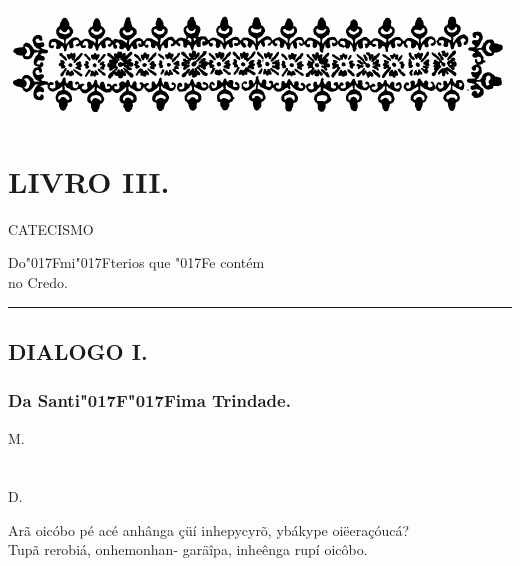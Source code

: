 \documentclass[openany,titlepage,12pt]{book}
\renewcommand{\chaptermark}[1]{\markboth{#1}{}}
\renewcommand{\sectionmark}[1]{\gdef\rightmark{#1}}
\newcommand{\lgS}{\char"017F}
\newcommand{\lgSS}{\char"017F\char"017F}
\begin{document}
\begin{center}
    \vspace*{20pt}
    \includegraphics[scale=0.33]{12.livro3.png}
\end{center}
\unskip
\vspace{-30pt}
{\let\clearpage\relax \chapter{\Huge LIVRO III.}}
\unskip
\vspace{-2pt}
\begin{center}
    {\large CATECISMO}
\end{center}
\unskip
\begin{center}
    Do\lgS mi\lgS terios que \lgS e contém\\
    no Credo.
\end{center}
\unskip
\par\noindent\rule{\textwidth}{0.4pt}
\unskip\vspace{-3pt}
\section{DIALOGO I.}
\unskip\vspace{-3pt}
\subsection{Da Santi\lgSS ima Trindade.}
\chaptermark{Dialogo I.}
\sectionmark{Da Santi\lgSS ima Trindade.}

\hspace*{-1.5ex}\begin{minipage}[t]{0.03\linewidth}
    M.\\ \\ \\D.\\ 
\end{minipage}
\hspace*{1ex}\begin{minipage}[t]{1.08\linewidth}
    \lettrine
    [findent =-2pt, nindent=0pt, loversize=-0.2, lraise=0.05, lines=5]
    {}{A}rã oicóbo pé acé anhânga\linebreak
    \hspace*{2ex}çüí inhepycyrõ, ybákype\linebreak
    \hspace*{2ex}oiëeraçóucá?\\
    Tupã rerobiá, onhemonhan-\linebreak
    garäîpa, inheênga rupí oicôbo.
\end{minipage}\\
\end{document}
